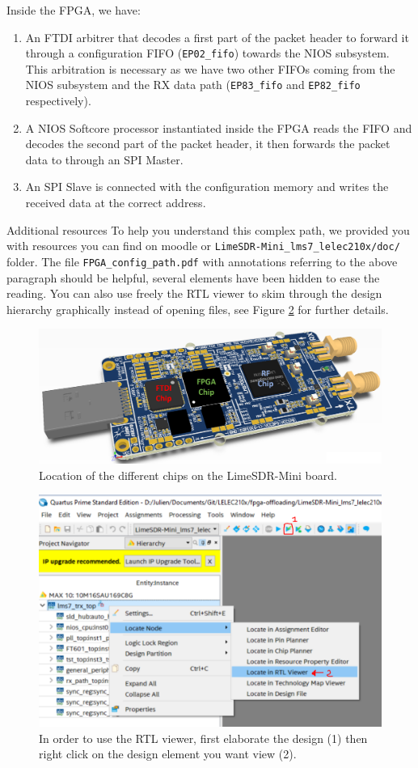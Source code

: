 Inside the FPGA, we have:
\begin{enumerate}
    \item An FTDI arbitrer that decodes a first part of the packet header to forward it through a configuration FIFO (\texttt{EP02\_fifo}) towards the NIOS subsystem. This arbitration is necessary as we have two other FIFOs coming from the NIOS subsystem and the RX data path (\texttt{EP83\_fifo} and \texttt{EP82\_fifo} respectively).
    \item A NIOS Softcore processor instantiated inside the FPGA reads the FIFO and decodes the second part of the packet header, it then forwards the packet data to through an SPI Master.
    \item An SPI Slave is connected with the configuration memory and writes the received data at the correct address.
\end{enumerate}

\begin{bclogo}[couleur = gray!20, arrondi = 0.2, logo=\bcinfo]{Additional resources}
To help you understand this complex path, we provided you with resources you can find on moodle or \texttt{LimeSDR-Mini\_lms7\_lelec210x/doc/} folder. The file \texttt{FPGA\_config\_path.pdf} with annotations referring to the above paragraph should be helpful, several elements have been hidden to ease the reading. You can also use freely the RTL viewer to skim through the design hierarchy graphically instead of opening files, see Figure \ref{fig:rtl_viewer} for further details.
\end{bclogo}

\begin{figure}[!h]
    \centering
    \includegraphics[width=0.7\linewidth]{figures/limesdrmini_schematic.png}
    \caption{Location of the different chips on the LimeSDR-Mini board.}
    \label{fig:limesdr_mini_schematic}
\end{figure}

\begin{figure}[!h]
    \centering
    \includegraphics[width=0.7\linewidth]{figures/rtl_viewer.png}
    \caption{In order to use the RTL viewer, first elaborate the design (1) then right click on the design element you want view (2).}
    \label{fig:rtl_viewer}
\end{figure}